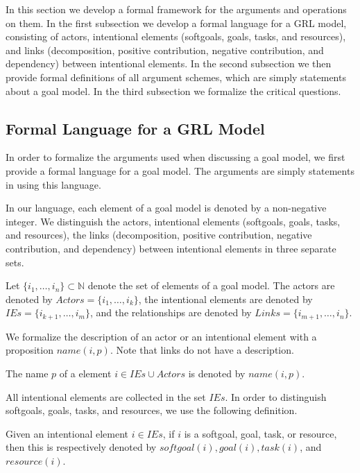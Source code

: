 \documentclass[11.5pt,two column]{llncs}
\begin{document}
In this section we develop a formal framework for the arguments and operations on them. In the first subsection we develop a formal language for a GRL model, consisting of actors, intentional elements (softgoals, goals, tasks, and resources), and links (decomposition, positive contribution, negative contribution, and dependency) between intentional elements. In the second subsection we then provide formal definitions of all argument schemes, which are simply statements about a goal model. In the third subsection we formalize the critical questions.

\subsection{Formal Language for a GRL Model}

In order to formalize the arguments used when discussing a goal model, we first provide a formal language for a goal model. The arguments are simply statements in using this language.

In our language, each element of a goal model is denoted by a non-negative integer. We distinguish the actors, intentional elements (softgoals, goals, tasks, and resources), the links (decomposition, positive contribution, negative contribution, and dependency) between intentional elements in three separate sets.

\begin{definition}[Elements]
Let $\{i_1,\ldots,i_n\}\subset \mathbb{N}$ denote the set of elements of a goal model.
The actors are denoted by $Actors=\{i_1,\ldots,i_k\}$, the intentional elements are denoted by $IEs=\{i_{k+1},\ldots,i_m\}$, and the relationships are denoted by $Links=\{i_{m+1},\ldots,i_n\}$.
\end{definition}

We formalize the description of an actor or an intentional element with a proposition $name(i,p)$. Note that links do not have a description.

\begin{definition}
The name $p$ of a element $i\in IEs\cup Actors$ is denoted by $name(i,p)$.
\end{definition}

All intentional elements are collected in the set $IEs$. In order to distinguish softgoals, goals, tasks, and resources, we use the following definition.

\begin{definition}
Given an intentional element $i\in IEs$, if $i$ is a softgoal, goal, task, or resource, then this is respectively denoted by $softgoal(i), goal(i), task(i)$, and $resource(i)$.
\end{definition}
\end{document}
